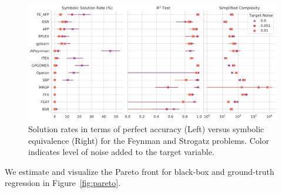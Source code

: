 \begin{figure}
    \centering
    \includegraphics[width=\textwidth]{figs/results_sym_data/pairgrid_symbolic_solution_rate_(pct)_r2_test_simplified_complexity.pdf}
    \caption{
        Solution rates in terms of perfect accuracy (Left) versus symbolic equivalence (Right) for the Feynman and Strogatz problems. 
        Color indicates level of noise added to the target variable. 
    }
    \label{fig:symbolic_solns}
\end{figure}

We estimate and visualize the Pareto front for black-box and ground-truth regression in Figure~\ref{fig:pareto}. 

